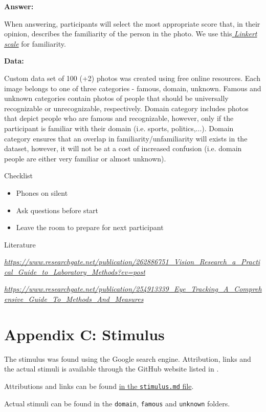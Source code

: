 \documentclass{llncs}
\begin{document}
\textbf{Answer:}

When answering, participants will select the most appropriate score
that, in their opinion, describes the familiarity of the person in the
photo. We use
this\href{http://www.sawtoothsoftware.com/support/knowledge-base/design-and-methodology-issues/1444-likert-scale-response-anchors}{\emph{
Linkert scale}} for familiarity.

\textbf{Data:}

Custom data set of 100 (+2) photos was created using free online
resources. Each image belongs to one of three categories - famous,
domain, unknown. Famous and unknown categories contain photos of people
that should be universally recognizable or unrecognizable, respectively.
Domain category includes photos that depict people who are famous and
recognizable, however, only if the participant is familiar with their
domain (i.e. sports, politics,...). Domain category ensures that an
overlap in familiarity/unfamiliarity will exists in the dataset,
however, it will not be at a cost of increased confusion (i.e. domain
people are either very familiar or almost unknown).

\protect\hypertarget{anchor-1}{}{}Checklist

\begin{itemize}
\item
  Phones on silent
\item
  Ask questions before start
\item
  Leave the room to prepare for next participant
\end{itemize}

\protect\hypertarget{anchor-2}{}{}Literature

\href{https://www.researchgate.net/publication/262886751_Vision_Research_a_Practical_Guide_to_Laboratory_Methods?ev=post}{\emph{https://www.researchgate.net/publication/262886751\_Vision\_Research\_a\_Practical\_Guide\_to\_Laboratory\_Methods?ev=post}}

\href{https://www.researchgate.net/publication/254913339_Eye_Tracking_A_Comprehensive_Guide_To_Methods_And_Measures}{\emph{https://www.researchgate.net/publication/254913339\_Eye\_Tracking\_A\_Comprehensive\_Guide\_To\_Methods\_And\_Measures}}

\clearpage

\section*{Appendix C: Stimulus}
\label{appendix:stimulus}

The stimulus was found using the Google search engine. Attribution, links and the actual stimuli is available through the GitHub
website listed in .

Attributions and links can be found \href{https://github.com/Jegp/facerecognition/blob/master/stimulus.md}{in the \texttt{stimulus.md} file}.

Actual stimuli can be found in the \texttt{domain}, \texttt{famous} and \texttt{unknown} folders.
\end{document}

